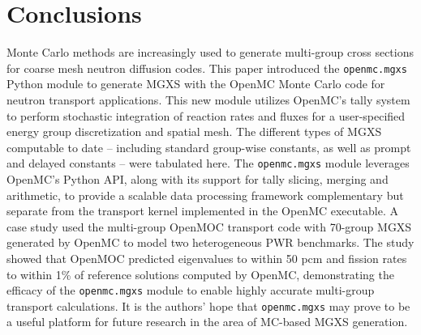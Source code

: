 \section{Conclusions}
\label{sec:conclusions}

Monte Carlo methods are increasingly used to generate multi-group cross sections for coarse mesh neutron diffusion codes. This paper introduced the \texttt{openmc.mgxs} Python module to generate MGXS with the OpenMC Monte Carlo code for neutron transport applications. This new module utilizes OpenMC's tally system to perform stochastic integration of reaction rates and fluxes for a user-specified energy group discretization and spatial mesh. The different types of MGXS computable to date -- including standard group-wise constants, as well as prompt and delayed constants -- were tabulated here. The \texttt{openmc.mgxs} module leverages OpenMC's Python API, along with its support for tally slicing, merging and arithmetic, to provide a scalable data processing framework complementary but separate from the transport kernel implemented in the OpenMC executable. A case study used the multi-group OpenMOC transport code with 70-group MGXS generated by OpenMC to model two heterogeneous PWR benchmarks. The study showed that OpenMOC predicted eigenvalues to within 50 pcm and fission rates to within 1\% of reference solutions computed by OpenMC, demonstrating the efficacy of the \texttt{openmc.mgxs} module to enable highly accurate multi-group transport calculations. It is the authors' hope that \texttt{openmc.mgxs} may prove to be a useful platform for future research in the area of MC-based MGXS generation.

